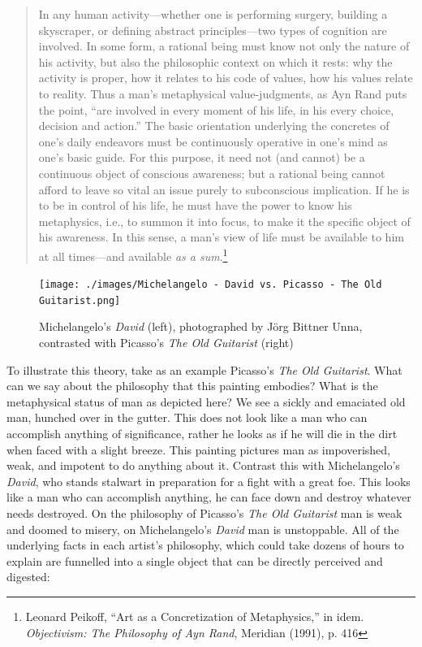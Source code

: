 \documentclass[11pt]{article}
\begin{document}
\begin{quote}
In any human activity—whether one is performing surgery, building a skyscraper, or defining abstract principles—two types of cognition are involved. In some form, a rational being must know not only the nature of his activity, but also the philosophic context on which it rests: why the activity is proper, how it relates to his code of values, how his values relate to reality. Thus a man's metaphysical value-judgments, as Ayn Rand puts the point, ``are involved in every moment of his life, in his every choice, decision and action.'' The basic orientation underlying the concretes of one's daily endeavors must be continuously operative in one's mind as one's basic guide. For this purpose, it need not (and cannot) be a continuous object of conscious awareness; but a rational being cannot afford to leave so vital an issue purely to subconscious implication. If he is to be in control of his life, he must have the power to know his metaphysics, i.e., to summon it into focus, to make it the specific object of his awareness. In this sense, a man's view of life must be available to him at all times—and available \emph{as a sum}.\footnote{Leonard Peikoff, ``Art as a Concretization of Metaphysics,'' in idem. \emph{Objectivism: The Philosophy of Ayn Rand}, Meridian (1991), p. 416}
\end{quote}

\begin{figure}[htbp]
\centering
\texttt{[image: ./images/Michelangelo - David vs. Picasso - The Old Guitarist.png]}
\caption{Michelangelo's \emph{David} (left), photographed by Jörg Bittner Unna, contrasted with Picasso's \emph{The Old Guitarist} (right)}
\end{figure}

To illustrate this theory, take as an example Picasso's \emph{The Old Guitarist}. What can we say about the philosophy that this painting embodies? What is the metaphysical status of man as depicted here? We see a sickly and emaciated old man, hunched over in the gutter. This does not look like a man who can accomplish anything of significance, rather he looks as if he will die in the dirt when faced with a slight breeze. This painting pictures man as impoverished, weak, and impotent to do anything about it. Contrast this with Michelangelo's \emph{David}, who stands stalwart in preparation for a fight with a great foe. This looks like a man who can accomplish anything, he can face down and destroy whatever needs destroyed. On the philosophy of Picasso's \emph{The Old Guitarist} man is weak and doomed to misery, on Michelangelo's \emph{David} man is unstoppable. All of the underlying facts in each artist's philosophy, which could take dozens of hours to explain are funnelled into a single object that can be directly perceived and digested:
\end{document}

